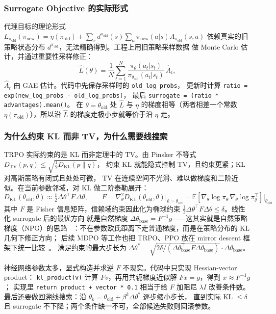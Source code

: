 \documentclass[12pt]{article}
\begin{document}
\subsubsection{Surrogate Objective 的实际形式}

代理目标的理论形式
$L_{\pi_\mathrm{old}}(\pi_\mathrm{new})=\eta(\pi_\mathrm{old})+\sum_s d^{\pi_\mathrm{old}}(s)\sum_a \pi_\mathrm{new}(a|s)A_{\pi_\mathrm{old}}(s,a)$
依赖真实的旧策略状态分布 $d^{\pi_\mathrm{old}}$，无法精确得到。工程上用旧策略采样数据
做 Monte Carlo 估计，并通过重要性采样修正：
\[
    \hat L(\theta) = \frac{1}{N}\sum_{t=1}^{N}
    \frac{\pi_\theta(a_t|s_t)}{\pi_{\theta_{\mathrm{old}}}(a_t|s_t)}\,\hat A_t,
\]
$\hat A_t$ 由 GAE 估计。代码中先保存采样时的 \texttt{old\_log\_probs}，
更新时计算 \texttt{ratio = exp(new\_log\_probs - old\_log\_probs)}，
最后 \texttt{surrogate = (ratio * advantages).mean()}。
在 $\theta=\theta_\mathrm{old}$ 处 $\hat L$ 与 $\eta$ 的梯度相等（两者相差一个常数
$\eta(\pi_\mathrm{old})$），所以沿 $\hat L$ 的梯度走极小步就等价于沿 $\eta$ 走。

\subsubsection{为什么约束 KL 而非 TV，为什么需要线搜索}

TRPO 实际约束的是 KL 而非定理中的 TV。由 Pinsker 不等式
$D_\mathrm{TV}(p,q) \leq \sqrt{\tfrac{1}{2}D_\mathrm{KL}(p\|q)}$，
约束 KL 就能隐式控制 TV，且约束更紧；KL 对高斯策略有闭式且处处可微，
TV 在连续空间不光滑、难以做梯度和二阶近似。在当前参数邻域，对 KL 做二阶泰勒展开：
\[
    D_{\mathrm{KL}}(\theta_{\mathrm{old}}, \theta) \approx
    \tfrac{1}{2}\Delta\theta^\top F\,\Delta\theta,
    \qquad
    F = \nabla^2_\theta D_{\mathrm{KL}}(\theta_{\mathrm{old}}, \theta)
    \big|_{\theta=\theta_{\mathrm{old}}}
    = \mathbb{E}\!\left[
      \nabla_\theta\log\pi_\theta \,
      \nabla_\theta\log\pi_\theta^\top
    \right]\bigg|_{\theta_{\mathrm{old}}}
\]
其中 $F$ 是 Fisher 信息矩阵，信赖域约束因此化为椭球约束
$\frac{1}{2}\Delta\theta^\top F\Delta\theta \leq \delta$。线性化 surrogate 后的最优方向
就是自然梯度 $\Delta\theta_\mathrm{base}=F^{-1}g$——这其实就是自然策略梯度（NPG）的思路
~\cite{npg,spinningup}：不在参数欧氏距离下走普通梯度，而是在策略分布的 KL 几何下修正方向；
后续 MDPO 等工作也把 TRPO、PPO 放在 mirror descent 框架下统一比较~\cite{mdpo}。
满足约束的最大步长为
$\Delta\theta^* = \sqrt{2\delta/(\Delta\theta_\mathrm{base}^\top F\Delta\theta_\mathrm{base})}\cdot\Delta\theta_\mathrm{base}$。

神经网络参数太多，显式构造并求逆 $F$ 不现实。代码中只实现 Hessian-vector product：
\texttt{kl\_product(v)} 计算 $Fv$，再用共轭梯度近似解 $Fx=g$，得到 $x\approx F^{-1}g$；
实现里 \texttt{return product + vector * 0.1} 相当于给 $F$ 加阻尼 $\lambda I$ 改善条件数。
最后还要做回溯线搜索：沿 $\theta_k=\theta_\mathrm{old}+\beta^k\Delta\theta^*$ 逐步缩小步长，
直到实际 KL $\leq\delta$ 且 surrogate 不下降；两个条件缺一不可，全部候选失败则回滚参数。
\end{document}
